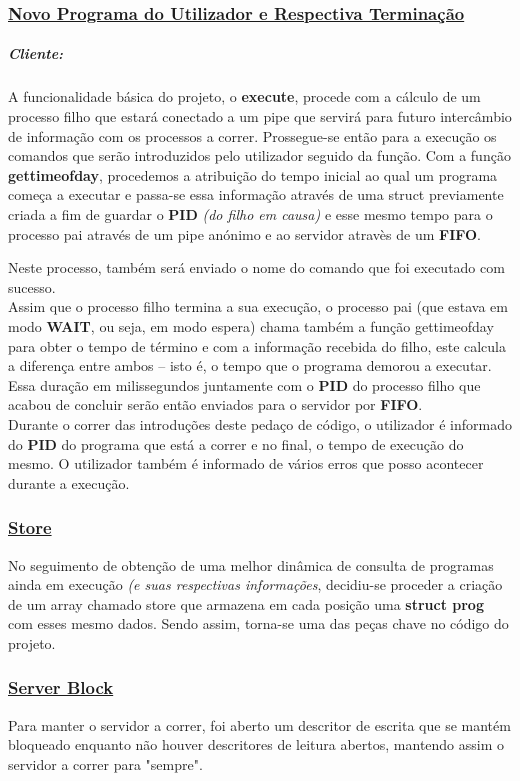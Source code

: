 \documentclass{report}
\begin{document}
\subsubsection{\underline{Novo Programa do Utilizador e Respectiva Terminação}}

\subparagraph{Cliente:}
A funcionalidade básica do projeto, o \textbf{execute}, procede com a cálculo de um processo filho que estará conectado a um pipe que servirá para futuro intercâmbio de informação com os processos a correr. Prossegue-se então para a execução os comandos que serão introduzidos pelo utilizador seguido da função.
Com a função \textbf{gettimeofday}, procedemos a atribuição do tempo inicial ao qual um programa começa a executar e passa-se essa informação através de uma struct previamente criada a fim de guardar o \textbf{PID} \textit{(do filho em causa)} e esse mesmo tempo para o processo pai através de um pipe anónimo e ao servidor atravès de um \textbf{FIFO}.\par
Neste processo, também será enviado o nome do comando que foi executado com sucesso.\\

Assim que o processo filho termina a sua execução, o processo pai (que estava em modo \textbf{WAIT}, ou seja, em modo espera) chama também a função gettimeofday para obter o tempo de término e com a informação recebida do filho, este calcula a diferença entre ambos – isto é, o tempo que o programa demorou a executar. Essa duração em milissegundos juntamente com o \textbf{PID} do processo filho que acabou de concluir serão então enviados para o servidor por \textbf{FIFO}.\\

Durante o correr das introduções deste pedaço de código, o utilizador é informado do \textbf{PID} do programa que está a correr e no final, o tempo de execução do mesmo. O utilizador também é informado de vários erros que posso acontecer durante a execução.

\subsubsection{\underline{Store}}
No seguimento de obtenção de uma melhor dinâmica de consulta de programas ainda em execução \textit{(e suas respectivas informações}, decidiu-se proceder a criação de um array chamado store que armazena em cada posição uma \textbf{struct prog} com esses mesmo dados. Sendo assim, torna-se uma das peças chave no código do projeto.
\subsubsection{\underline{Server Block}}
Para manter o servidor a correr, foi aberto um descritor de escrita que se mantém bloqueado enquanto não houver descritores de leitura abertos, mantendo assim o servidor a correr para "sempre".
\end{document}
